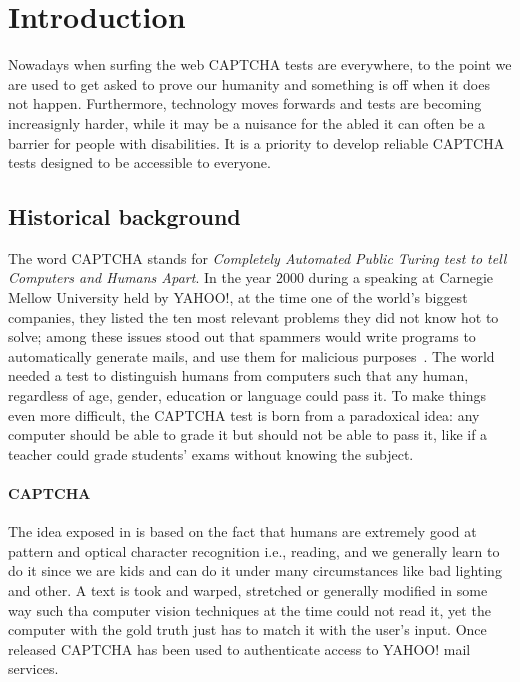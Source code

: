 \section{Introduction}
Nowadays when surfing the web CAPTCHA tests are everywhere, to the point we are used to get asked to prove our humanity and something is off when it does not happen.
Furthermore, technology moves forwards and tests are becoming increasignly harder, while it may be a nuisance for the abled it can often be a barrier for people with disabilities.
It is a priority to develop reliable CAPTCHA tests designed to be accessible to everyone.

\subsection{Historical background}
The word CAPTCHA stands for \emph{Completely Automated Public Turing test to tell Computers and Humans Apart}.
In the year 2000 during a speaking at Carnegie Mellow University held by YAHOO!, at the time one of the world's biggest companies, they listed the ten most relevant problems they did not know hot to solve; among these issues stood out that spammers would write programs to automatically generate mails, and use them for malicious purposes~\cite{vox2021captcha,theverge2019captcha}.
The world needed a test to distinguish humans from computers such that any human, regardless of age, gender, education or language could pass it.
To make things even more difficult, the CAPTCHA test is born from a paradoxical idea: any computer should be able to grade it but should not be able to pass it, like if a teacher could grade students' exams without knowing the subject.

\paragraph{CAPTCHA}
The idea exposed in \cite{vonahn2003captcha} is based on the fact that humans are extremely good at pattern and optical character recognition i.e., reading, and we
generally learn to do it since we are kids and can do it under many circumstances like bad lighting and other.
A text is took and warped, stretched or generally modified in some way such tha computer vision techniques at the time could not read it, yet the computer with the gold truth just has to match it with the user's input.
Once released CAPTCHA has been used to authenticate access to YAHOO! mail services.

